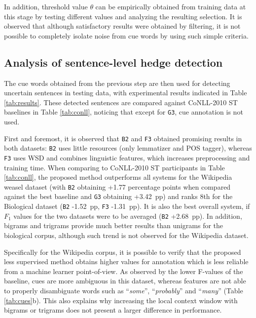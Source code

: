 \documentclass[english]{jnlp_1.4}
\begin{document}
In addition, threshold value $\theta$ can be empirically obtained from training data at this stage by testing different values and analyzing the resulting selection. It is observed that although satisfactory results were obtained by filtering, it is not possible to completely isolate noise from cue words by using such simple criteria.


\subsection{Analysis of sentence-level hedge detection}

The cue words obtained from the previous step are then used for detecting uncertain sentences in testing data, with experimental results indicated in Table \ref{tab:results}. These detected sentences are compared against CoNLL-2010 ST baselines in Table \ref{tab:conll}, noticing that except for \texttt{G3}, cue annotation is not used.

\begin{table}[t]
\label{tab:results}

\end{table}

First and foremost, it is observed that \texttt{B2} and \texttt{F3} obtained promising results in both datasets: \texttt{B2} uses little resources (only lemmatizer and POS tagger), whereas \texttt{F3} uses WSD and combines linguistic features, which increases preprocessing and training time. When comparing to CoNLL-2010 ST participants in Table \ref{tab:conll}, the proposed method outperforms all systems for the Wikipedia weasel dataset (with \texttt{B2} obtaining +1.77 percentage points when compared against the best baseline and \texttt{G3} obtaining +3.42~pp) and ranks 8th for the Biological dataset (\texttt{B2} -1.52~pp, \texttt{F3} -1.31~pp). It is also the best overall system, if $F_1$ values for the two datasets were to be averaged (\texttt{B2} +2.68~pp). In addition, bigrams and trigrams provide much better results than unigrams for the biological corpus, although such trend is not observed for the Wikipedia dataset.

Specifically for the Wikipedia corpus, it is possible to verify that the proposed less supervised method obtains higher values for annotation which is less reliable from a machine learner point-of-view. As observed by the lower F-values of the baseline, cues are more ambiguous in this dataset, whereas features are not able to properly disambiguate words such as ``\emph{some}'', ``\emph{probably}'' and ``\emph{many}'' 
    (Table \ref{tab:cues}b). 
This also explains why increasing the local context window with bigrams or trigrams does not present a larger difference in performance.
\end{document}
